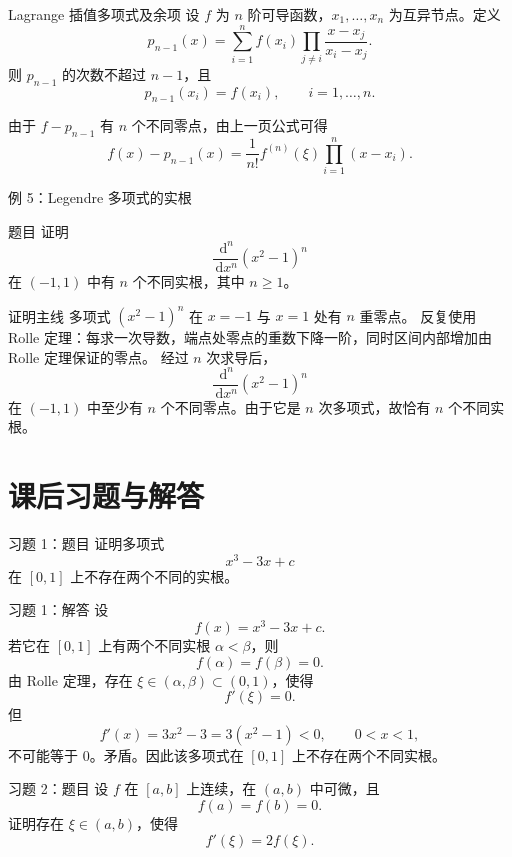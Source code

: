 \documentclass[aspectratio=169,10pt]{ctexbeamer}
\newcommand{\dd}{\,\mathrm{d}}
\begin{document}
\begin{frame}[t]{Lagrange 插值多项式及余项}
\footnotesize
设 $f$ 为 $n$ 阶可导函数，$x_1,\ldots,x_n$ 为互异节点。定义
\[
  p_{n-1}(x)=
  \sum_{i=1}^n
  f(x_i)\prod_{j\ne i}\frac{x-x_j}{x_i-x_j}.
\]
则 $p_{n-1}$ 的次数不超过 $n-1$，且
\[
  p_{n-1}(x_i)=f(x_i),\qquad i=1,\ldots,n.
\]

由于 $f-p_{n-1}$ 有 $n$ 个不同零点，由上一页公式可得
\[
  f(x)-p_{n-1}(x)
  =
  \frac1{n!}f^{(n)}(\xi)\prod_{i=1}^n(x-x_i).
\]
\end{frame}

\begin{frame}[t]{例 5：Legendre 多项式的实根}
\small
\begin{block}{题目}
证明
\[
  \frac{\dd^n}{\dd x^n}(x^2-1)^n
\]
在 $(-1,1)$ 中有 $n$ 个不同实根，其中 $n\ge1$。
\end{block}

\begin{block}{证明主线}
多项式 $(x^2-1)^n$ 在 $x=-1$ 与 $x=1$ 处有 $n$ 重零点。
反复使用 Rolle 定理：每求一次导数，端点处零点的重数下降一阶，同时区间内部增加由 Rolle 定理保证的零点。
经过 $n$ 次求导后，
\[
  \frac{\dd^n}{\dd x^n}(x^2-1)^n
\]
在 $(-1,1)$ 中至少有 $n$ 个不同零点。由于它是 $n$ 次多项式，故恰有 $n$ 个不同实根。
\end{block}
\end{frame}

\section{课后习题与解答}

\begin{frame}[t]{习题 1：题目}
\small
证明多项式
\[
  x^3-3x+c
\]
在 $[0,1]$ 上不存在两个不同的实根。
\end{frame}

\begin{frame}[t]{习题 1：解答}
\small
设
\[
  f(x)=x^3-3x+c.
\]
若它在 $[0,1]$ 上有两个不同实根 $\alpha<\beta$，则
\[
  f(\alpha)=f(\beta)=0.
\]
由 Rolle 定理，存在 $\xi\in(\alpha,\beta)\subset(0,1)$，使得
\[
  f'(\xi)=0.
\]
但
\[
  f'(x)=3x^2-3=3(x^2-1)<0,\qquad 0<x<1,
\]
不可能等于 $0$。矛盾。因此该多项式在 $[0,1]$ 上不存在两个不同实根。
\end{frame}

\begin{frame}[t]{习题 2：题目}
\small
设 $f$ 在 $[a,b]$ 上连续，在 $(a,b)$ 中可微，且
\[
  f(a)=f(b)=0.
\]
证明存在 $\xi\in(a,b)$，使得
\[
  f'(\xi)=2f(\xi).
\]
\end{frame}
\end{document}
